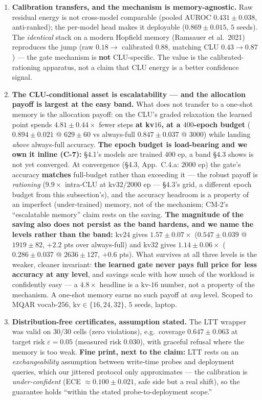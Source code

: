 \documentclass[11pt]{article}
\begin{document}
\begin{enumerate}\itemsep2pt
\item \textbf{Calibration transfers, and the mechanism is memory-agnostic.} Raw residual energy is not cross-model comparable (pooled AUROC $0.431\pm0.038$, anti-ranked); the per-model head makes it deployable ($0.869\pm0.015$, $5$ seeds). The \emph{identical} stack on a modern Hopfield memory (Ramsauer et al.\ 2021) reproduces the jump (raw $0.18\to$ calibrated $0.88$, matching CLU $0.43\to0.87$) --- the gate mechanism is \textbf{not} CLU-specific. The value is the calibrated-rationing apparatus, not a claim that CLU energy is a better confidence signal.
\item \textbf{The CLU-conditional asset is escalatability --- and the allocation payoff is largest at the easy band.} What does not transfer to a one-shot memory is the allocation payoff: on the CLU's graded relaxation the learned point spends $4.81\pm0.44\times$ fewer steps \textbf{at kv$16$, at a $400$-epoch budget} ($0.894\pm0.021$ @ $629\pm60$ vs always-full $0.847\pm0.037$ @ $3000$) while landing \emph{above} always-full accuracy. \textbf{The epoch budget is load-bearing and we own it inline (C-7):} \S4.1's models are trained $400$ ep, a band \S4.3 shows is not yet converged. At convergence (\S4.3, App.~C.4.a: $2000$ ep) the gate's accuracy \textbf{matches} full-budget rather than exceeding it --- the robust payoff is \emph{rationing} ($9.9\times$ intra-CLU at kv$32$/$2000$ ep --- \S4.3's grid, a different epoch budget from this subsection's), and the accuracy headroom is a property of an imperfect (under-trained) memory, not of the mechanism; CM-2's ``escalatable memory'' claim rests on the saving. \textbf{The magnitude of the saving also does not persist as the band hardens, and we name the levels rather than the band:} kv$24$ gives $1.57\pm0.07\times$ ($0.547\pm0.039$ @ $1919\pm82$, $+2.2$ pts over always-full) and kv$32$ gives $1.14\pm0.06\times$ ($0.286\pm0.037$ @ $2636\pm127$, $+0.6$ pts). What survives at all three levels is the weaker, cleaner invariant: \textbf{the learned gate never pays full price for less accuracy at any level}, and savings scale with how much of the workload is confidently easy --- a $4.8\times$ headline is a kv-$16$ number, not a property of the mechanism. A one-shot memory earns no such payoff at \emph{any} level. Scoped to MQAR vocab-$256$, kv$\in\{16,24,32\}$, $5$ seeds, laptop.
\item \textbf{Distribution-free certificates, assumption stated.} The LTT wrapper was valid on $30/30$ cells (zero violations), e.g.\ coverage $0.647\pm0.063$ at target risk $\varepsilon=0.05$ (measured risk $0.030$), with graceful refusal where the memory is too weak. \textbf{Fine print, next to the claim:} LTT rests on an \emph{exchangeability} assumption between write-time probes and deployment queries, which our jittered protocol only approximates --- the calibration is \emph{under-confident} (ECE $\approx0.100\pm0.021$, safe side but a real shift), so the guarantee holds ``within the stated probe-to-deployment scope.''
\end{enumerate}
\end{document}
